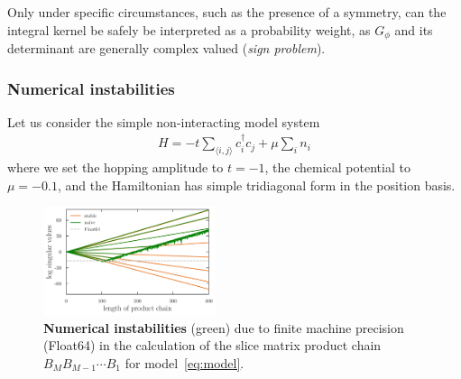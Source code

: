 \documentclass[%
 reprint,
superscriptaddress,
showpacs,
 amsmath,amssymb,
 aps,
 prb,
longbibliography,
]{revtex4-1}
\begin{document}
Only under specific circumstances, such as the presence of a symmetry, can the integral kernel be safely be interpreted as a probability weight, as $G_\phi$ and its determinant are generally complex valued (\textit{sign problem}).

\subsubsection{Numerical instabilities}



Let us consider the simple non-interacting model system
\begin{align}
	H = -t\sum_{\langle i,j \rangle} c_i^\dagger c_j + \mu \sum_i n_i \label{eq:model}
\end{align}
where we set the hopping amplitude to $t=-1$, the chemical potential to $\mu=-0.1$, and the Hamiltonian has simple tridiagonal form in the position basis.


\begin{figure}[h]
	\includegraphics[width=0.45\textwidth]{../notebooks/naive_vs_stable.pdf}
	\caption{\textbf{Numerical instabilities} (green) due to finite machine precision (Float64) in the calculation of the slice matrix product chain $B_M B_{M-1} \cdots B_1$ for model~\eqref{eq:model}. \label{fig:naive_vs_stable}}
\end{figure}
\end{document}
